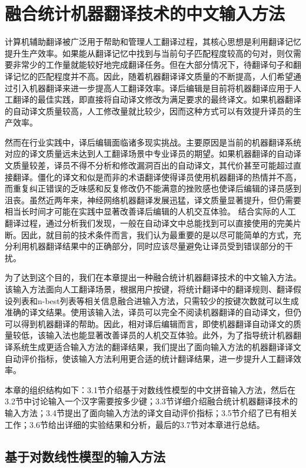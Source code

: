 
\chapter{融合统计机器翻译技术的中文输入方法}
\label{Chapter_cocat}

计算机辅助翻译被广泛用于帮助和管理人工翻译过程，其核心思想是利用翻译记忆提升生产效率。如果能从翻译记忆中找到与当前句子匹配程度较高的句对，则仅需要非常少的工作量就能较好地完成翻译任务。但在大部分情况下，待翻译句子和翻译记忆的匹配程度并不高。因此，随着机器翻译译文质量的不断提高，人们希望通过引入机器翻译来进一步提高人工翻译效率。译后编辑是目前将机器翻译应用于人工翻译的最佳实践，即直接将自动译文修改为满足要求的最终译文。如果机器翻译的自动译文质量较高，人工修改量就比较少，因而这种方式可以有效提升译员的生产效率。

然而在行业实践中，译后编辑面临诸多现实挑战。主要原因是当前的机器翻译系统对应的译文质量远未达到人工翻译场景中专业译员的期望。如果机器翻译的自动译文质量较差，译员不得不分析和修改漏洞百出的自动译文，其代价甚至可能超过直接翻译。僵化的译文和似是而非的术语翻译使得译员使用机器翻译的热情并不高，而重复纠正错误的乏味感和反复修改仍不能满意的挫败感也使译后编辑的译员感到沮丧。虽然近两年来，神经网络机器翻译发展迅猛，译文质量显著提升，但仍需要相当长时间才可能在实践中显著改善译后编辑的人机交互体验。
结合实际的人工翻译过程，通过分析我们发现，一般在自动译文中总能找到可以直接使用的完美片断。因此，就目前的技术条件而言，我们认为最重要的是以尽可能简单的方式，充分利用机器翻译结果中的正确部分，同时应该尽量避免让译员受到错误部分的干扰。

为了达到这个目的，我们在本章提出一种融合统计机器翻译技术的中文输入方法。该输入方法面向人工翻译场景，根据用户按键，将统计翻译中的翻译规则、翻译假设列表和n-best列表等相关信息融合进输入方法，只需较少的按键次数就可以生成准确的译文结果。使用该输入法，译员可以完全不阅读机器翻译的自动译文，但仍可以得到机器翻译的帮助。因此，相对译后编辑而言，即使机器翻译自动译文的质量较低，该输入法也能显著改善译员的人机交互体验。此外，为了指导统计机器翻译系统生成更适合输入方法的翻译结果，我们提出了面向输入方法的机器翻译译文自动评价指标，使该输入方法利用更合适的统计翻译结果，进一步提升人工翻译效率。

本章的组织结构如下：3.1节介绍基于对数线性模型的中文拼音输入方法，然后在3.2节中讨论输入一个汉字需要按多少键；3.3节详细介绍融合统计机器翻译技术的输入方法；3.4节提出了面向输入方法的译文自动评价指标；3.5节介绍了已有相关工作；3.6节给出详细的实验结果和分析，最后的3.7节对本章进行总结。

\section{基于对数线性模型的输入方法}

